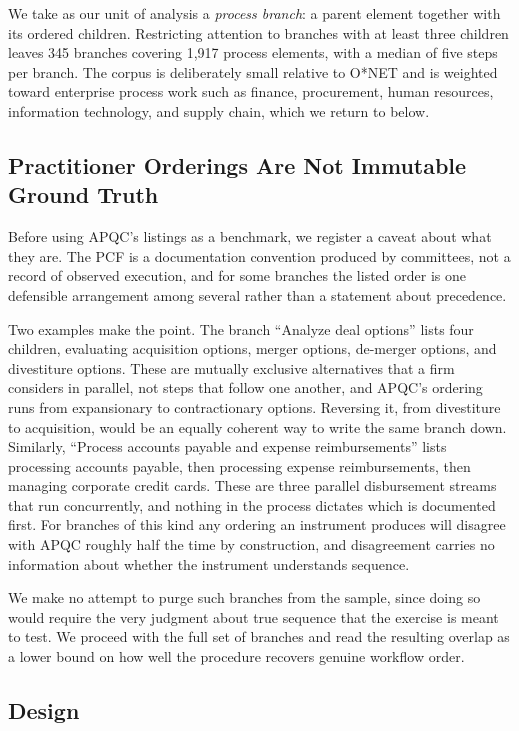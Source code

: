 We take as our unit of analysis a \emph{process branch}: a parent element together with its ordered children.
Restricting attention to branches with at least three children leaves 345 branches covering 1,917 process elements, with a median of five steps per branch.
The corpus is deliberately small relative to O*NET and is weighted toward enterprise process work such as finance, procurement, human resources, information technology, and supply chain, which we return to below.

\subsection{Practitioner Orderings Are Not Immutable Ground Truth}
\label{app:apqc_validation_caveat}

Before using APQC's listings as a benchmark, we register a caveat about what they are.
The PCF is a documentation convention produced by committees, not a record of observed execution, and for some branches the listed order is one defensible arrangement among several rather than a statement about precedence.

Two examples make the point.
The branch ``Analyze deal options'' lists four children, evaluating acquisition options, merger options, de-merger options, and divestiture options.
These are mutually exclusive alternatives that a firm considers in parallel, not steps that follow one another, and APQC's ordering runs from expansionary to contractionary options.
Reversing it, from divestiture to acquisition, would be an equally coherent way to write the same branch down.
Similarly, ``Process accounts payable and expense reimbursements'' lists processing accounts payable, then processing expense reimbursements, then managing corporate credit cards.
These are three parallel disbursement streams that run concurrently, and nothing in the process dictates which is documented first.
For branches of this kind any ordering an instrument produces will disagree with APQC roughly half the time by construction, and disagreement carries no information about whether the instrument understands sequence.

We make no attempt to purge such branches from the sample, since doing so would require the very judgment about true sequence that the exercise is meant to test.
We proceed with the full set of branches and read the resulting overlap as a lower bound on how well the procedure recovers genuine workflow order.

\subsection{Design}
\label{app:apqc_validation_design}

